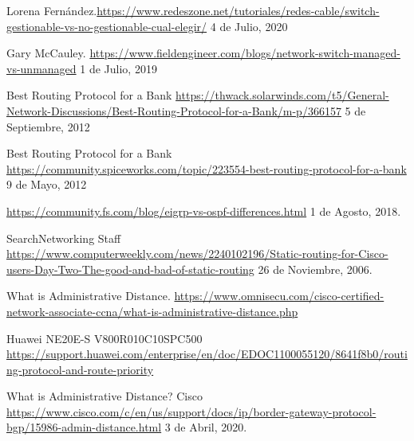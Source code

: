 \begin{thebibliography}{9}
Lorena Fernández.\href{https://www.redeszone.net/tutoriales/redes-cable/switch-gestionable-vs-no-gestionable-cual-elegir/}{https://www.redeszone.net/tutoriales/redes-cable/switch-gestionable-vs-no-gestionable-cual-elegir/} 4 de Julio, 2020

Gary McCauley. \href{https://www.fieldengineer.com/blogs/network-switch-managed-vs-unmanaged}{https://www.fieldengineer.com/blogs/network-switch-managed-vs-unmanaged} 1 de Julio, 2019

Best Routing Protocol for a Bank \href{https://thwack.solarwinds.com/t5/General-Network-Discussions/Best-Routing-Protocol-for-a-Bank/m-p/366157}{https://thwack.solarwinds.com/t5/General-Network-Discussions/Best-Routing-Protocol-for-a-Bank/m-p/366157} 5 de Septiembre, 2012

Best Routing Protocol for a Bank \href{https://community.spiceworks.com/topic/223554-best-routing-protocol-for-a-bank}{https://community.spiceworks.com/topic/223554-best-routing-protocol-for-a-bank} 9 de Mayo, 2012

\href{https://community.fs.com/blog/eigrp-vs-ospf-differences.html}{https://community.fs.com/blog/eigrp-vs-ospf-differences.html} 1 de Agosto, 2018.

SearchNetworking Staff \href{https://www.computerweekly.com/news/2240102196/Static-routing-for-Cisco-users-Day-Two-The-good-and-bad-of-static-routing}{https://www.computerweekly.com/news/2240102196/Static-routing-for-Cisco-users-Day-Two-The-good-and-bad-of-static-routing} 26 de Noviembre, 2006.

What is Administrative Distance. \href{https://www.omnisecu.com/cisco-certified-network-associate-ccna/what-is-administrative-distance.php}{https://www.omnisecu.com/cisco-certified-network-associate-ccna/what-is-administrative-distance.php}

Huawei NE20E-S V800R010C10SPC500 
\href{https://support.huawei.com/enterprise/en/doc/EDOC1100055120/8641f8b0/routing-protocol-and-route-priority}{https://support.huawei.com/enterprise/en/doc/EDOC1100055120/8641f8b0/routing-protocol-and-route-priority}

What is Administrative Distance? Cisco \href{https://www.cisco.com/c/en/us/support/docs/ip/border-gateway-protocol-bgp/15986-admin-distance.html}{https://www.cisco.com/c/en/us/support/docs/ip/border-gateway-protocol-bgp/15986-admin-distance.html} 3 de Abril, 2020.


\end{thebibliography}
